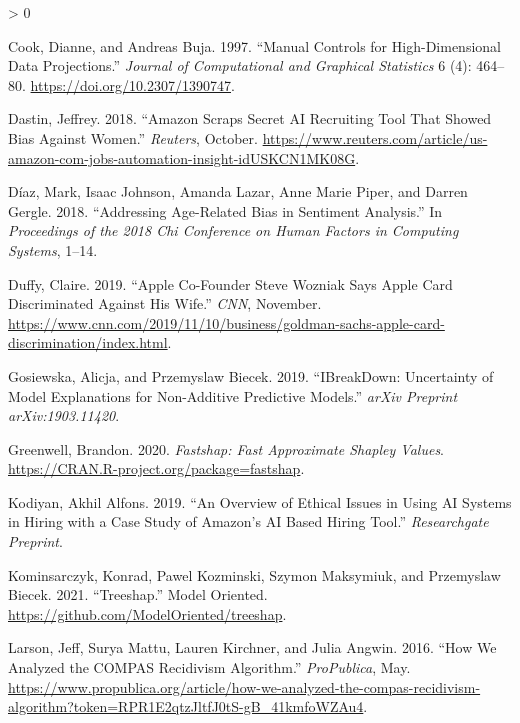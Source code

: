 \documentclass[
]{article}
\newlength{\cslhangindent}
\newenvironment{CSLReferences}[2] %
 {%
  \setlength{\parindent}{0pt}
  \ifodd #1 \everypar{\setlength{\hangindent}{\cslhangindent}}\ignorespaces\fi
  \ifnum #2 > 0
  \setlength{\parskip}{#2\baselineskip}
  \fi
 }%
 {}
\begin{document}
\begin{CSLReferences}{1}{0}
\leavevmode\hypertarget{ref-cook_manual_1997}{}%
Cook, Dianne, and Andreas Buja. 1997. {``Manual {Controls} for {High}-{Dimensional} {Data} {Projections}.''} \emph{Journal of Computational and Graphical Statistics} 6 (4): 464--80. \url{https://doi.org/10.2307/1390747}.

\leavevmode\hypertarget{ref-dastin_amazon_2018}{}%
Dastin, Jeffrey. 2018. {``Amazon Scraps Secret {AI} Recruiting Tool That Showed Bias Against Women.''} \emph{Reuters}, October. \url{https://www.reuters.com/article/us-amazon-com-jobs-automation-insight-idUSKCN1MK08G}.

\leavevmode\hypertarget{ref-diaz_addressing_2018}{}%
Díaz, Mark, Isaac Johnson, Amanda Lazar, Anne Marie Piper, and Darren Gergle. 2018. {``Addressing Age-Related Bias in Sentiment Analysis.''} In \emph{Proceedings of the 2018 Chi Conference on Human Factors in Computing Systems}, 1--14.

\leavevmode\hypertarget{ref-duffy_apple_2019}{}%
Duffy, Claire. 2019. {``Apple Co-Founder {Steve} {Wozniak} Says {Apple} {Card} Discriminated Against His Wife.''} \emph{CNN}, November. \url{https://www.cnn.com/2019/11/10/business/goldman-sachs-apple-card-discrimination/index.html}.

\leavevmode\hypertarget{ref-gosiewska_ibreakdown_2019}{}%
Gosiewska, Alicja, and Przemyslaw Biecek. 2019. {``{IBreakDown}: {Uncertainty} of Model Explanations for Non-Additive Predictive Models.''} \emph{arXiv Preprint arXiv:1903.11420}.

\leavevmode\hypertarget{ref-greenwell_fastshap_2020}{}%
Greenwell, Brandon. 2020. \emph{Fastshap: {Fast} {Approximate} {Shapley} {Values}}. \url{https://CRAN.R-project.org/package=fastshap}.

\leavevmode\hypertarget{ref-kodiyan_overview_2019}{}%
Kodiyan, Akhil Alfons. 2019. {``An Overview of Ethical Issues in Using {AI} Systems in Hiring with a Case Study of {Amazon}'s {AI} Based Hiring Tool.''} \emph{Researchgate Preprint}.

\leavevmode\hypertarget{ref-kominsarczyk_treeshap_2021}{}%
Kominsarczyk, Konrad, Pawel Kozminski, Szymon Maksymiuk, and Przemyslaw Biecek. 2021. {``Treeshap.''} Model Oriented. \url{https://github.com/ModelOriented/treeshap}.

\leavevmode\hypertarget{ref-larson_how_2016}{}%
Larson, Jeff, Surya Mattu, Lauren Kirchner, and Julia Angwin. 2016. {``How {We} {Analyzed} the {COMPAS} {Recidivism} {Algorithm}.''} \emph{ProPublica}, May. \url{https://www.propublica.org/article/how-we-analyzed-the-compas-recidivism-algorithm?token=RPR1E2qtzJltfJ0tS-gB_41kmfoWZAu4}.


\end{CSLReferences}
\end{document}
